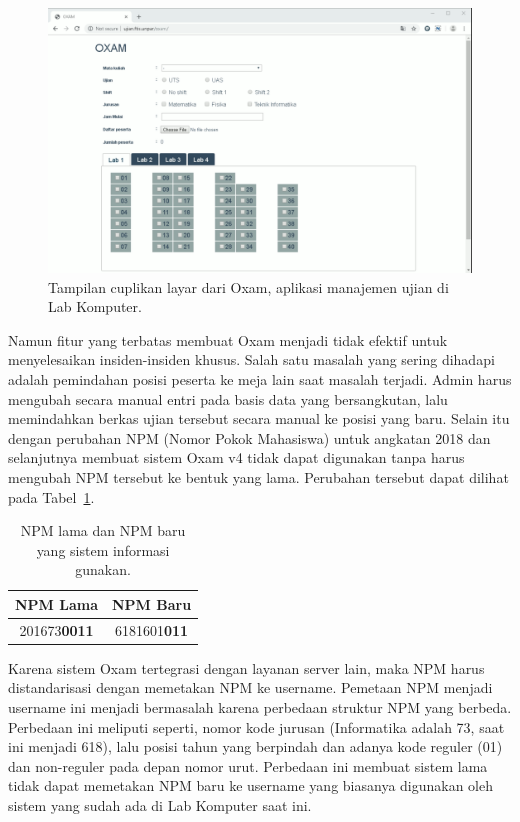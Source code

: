 \begin{figure}
    \centering
    \includegraphics[width=0.7\paperwidth]{Gambar/ss-oxam.png}
    \caption{Tampilan cuplikan layar dari Oxam, aplikasi manajemen ujian di Lab Komputer.}
    \label{fig:ss-Oxam}
\end{figure}

Namun fitur yang terbatas membuat Oxam menjadi tidak efektif untuk menyelesaikan
insiden-insiden khusus. Salah satu masalah yang sering dihadapi adalah
pemindahan posisi peserta ke meja lain saat masalah terjadi. Admin harus
mengubah secara manual entri pada basis data yang bersangkutan, lalu memindahkan
berkas ujian tersebut secara manual ke posisi yang baru. Selain itu dengan
perubahan NPM (Nomor Pokok Mahasiswa) untuk angkatan 2018 dan selanjutnya
membuat sistem Oxam v4 tidak dapat digunakan tanpa harus mengubah NPM
tersebut ke bentuk yang lama. Perubahan tersebut dapat dilihat pada Tabel~\ref{tab:table-npm}. 

\begin{table}[H]
    \centering
    \caption{NPM lama dan NPM baru yang sistem informasi gunakan.}
    \label{tab:table-npm}
    \def\arraystretch{2}
    \begin{tabular}{|c|c|}
        \hline
        \textbf{NPM Lama} & \textbf{NPM Baru} \\
        \hline
        201673\textbf{0011} & 6181601\textbf{011} \\
        \hline
    \end{tabular}
\end{table}

Karena sistem Oxam tertegrasi dengan layanan server lain, maka NPM harus
distandarisasi dengan memetakan NPM ke username. Pemetaan NPM menjadi username
ini menjadi bermasalah karena perbedaan struktur NPM yang berbeda. Perbedaan ini
meliputi seperti, nomor kode jurusan (Informatika adalah 73, saat ini menjadi
618), lalu posisi tahun yang berpindah dan adanya kode reguler (01) dan
non-reguler pada depan nomor urut. Perbedaan ini membuat sistem lama tidak dapat
memetakan NPM baru ke username yang biasanya digunakan oleh sistem yang sudah
ada di Lab Komputer saat ini.

